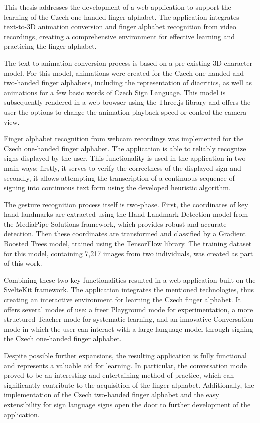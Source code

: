 \documentclass[
  master,
  program=ainfvs,
  biblatex,
  figures=true,
  tables=false,
  sourcecodes=true,
  glossaries,
  index
]{kidiplom}
\begin{document}
\begin{kiconclusions}[english]
    This thesis addresses the development of a web application to support the learning of the Czech one-handed finger alphabet. The application integrates text-to-3D animation conversion and finger alphabet recognition from video recordings, creating a comprehensive environment for effective learning and practicing the finger alphabet.

    The text-to-animation conversion process is based on a pre-existing 3D character model. For this model, animations were created for the Czech one-handed and two-handed finger alphabets, including the representation of diacritics, as well as animations for a few basic words of Czech Sign Language. This model is subsequently rendered in a web browser using the Three.js library and offers the user the options to change the animation playback speed or control the camera view.
    
    Finger alphabet recognition from webcam recordings was implemented for the Czech one-handed finger alphabet. The application is able to reliably recognize signs displayed by the user. This functionality is used in the application in two main ways: firstly, it serves to verify the correctness of the displayed sign and secondly, it allows attempting the transcription of a continuous sequence of signing into continuous text form using the developed heuristic algorithm.
    
    The gesture recognition process itself is two-phase. First, the coordinates of key hand landmarks are extracted using the Hand Landmark Detection model from the MediaPipe Solutions framework, which provides robust and accurate detection. Then these coordinates are transformed and classified by a Gradient Boosted Trees model, trained using the TensorFlow library. The training dataset for this model, containing 7,217 images from two individuals, was created as part of this work.
    
    Combining these two key functionalities resulted in a web application built on the SvelteKit framework. The application integrates the mentioned technologies, thus creating an interactive environment for learning the Czech finger alphabet. It offers several modes of use: a freer Playground mode for experimentation, a more structured Teacher mode for systematic learning, and an innovative Conversation mode in which the user can interact with a large language model through signing the Czech one-handed finger alphabet.
    
    Despite possible further expansions, the resulting application is fully functional and represents a valuable aid for learning. In particular, the conversation mode proved to be an interesting and entertaining method of practice, which can significantly contribute to the acquisition of the finger alphabet. Additionally, the implementation of the Czech two-handed finger alphabet and the easy extensibility for sign language signs open the door to further development of the application.
\end{kiconclusions}
\end{document}
